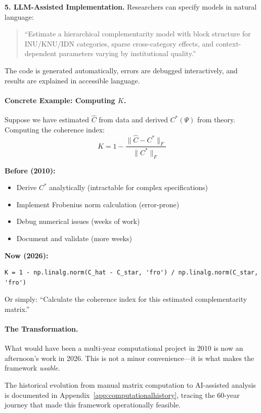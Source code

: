 \documentclass[12pt,a4paper]{article}
\begin{document}
\textbf{5. LLM-Assisted Implementation.}
Researchers can specify models in natural language:
\begin{quote}
``Estimate a hierarchical complementarity model with block structure
for INU/KNU/IDN categories, sparse cross-category effects,
and context-dependent parameters varying by institutional quality.''
\end{quote}

The code is generated automatically, errors are debugged interactively,
and results are explained in accessible language.

\paragraph{Concrete Example: Computing $K$.}
Suppose we have estimated $\hat{C}$ from data and derived $C^*(\Psi)$ from theory.
Computing the coherence index:
\begin{equation}
  K = 1 - \frac{\|\hat{C} - C^*\|_F}{\|C^*\|_F}
\end{equation}

\textbf{Before (2010):}
\begin{itemize}
  \item Derive $C^*$ analytically (intractable for complex specifications)
  \item Implement Frobenius norm calculation (error-prone)
  \item Debug numerical issues (weeks of work)
  \item Document and validate (more weeks)
\end{itemize}

\textbf{Now (2026):}
\begin{verbatim}
K = 1 - np.linalg.norm(C_hat - C_star, 'fro') / np.linalg.norm(C_star, 'fro')
\end{verbatim}

Or simply: ``Calculate the coherence index for this estimated complementarity matrix.''

\paragraph{The Transformation.}
What would have been a multi-year computational project in 2010
is now an afternoon's work in 2026.
This is not a minor convenience---it is what makes the framework \emph{usable}.

The historical evolution from manual matrix computation to AI-assisted analysis
is documented in Appendix~\ref{app:computationalhistory}, tracing the 60-year
journey that made this framework operationally feasible.
\end{document}
